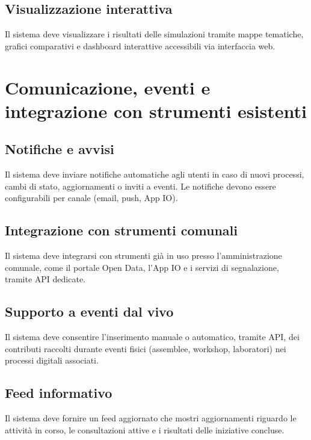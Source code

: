 \subsection{Visualizzazione interattiva}
Il sistema deve visualizzare i risultati delle simulazioni tramite mappe tematiche, grafici comparativi e dashboard interattive accessibili via interfaccia web.

\section{Comunicazione, eventi e integrazione con strumenti esistenti}

\subsection{Notifiche e avvisi}
Il sistema deve inviare notifiche automatiche agli utenti in caso di nuovi processi, cambi di stato, aggiornamenti o inviti a eventi.  
Le notifiche devono essere configurabili per canale (email, push, App IO).

\subsection{Integrazione con strumenti comunali}
Il sistema deve integrarsi con strumenti già in uso presso l’amministrazione comunale, come il portale Open Data, l’App IO e i servizi di segnalazione, tramite API dedicate.

\subsection{Supporto a eventi dal vivo}
Il sistema deve consentire l’inserimento manuale o automatico, tramite API, dei contributi raccolti durante eventi fisici (assemblee, workshop, laboratori) nei processi digitali associati.

\subsection{Feed informativo}
Il sistema deve fornire un feed aggiornato che mostri aggiornamenti riguardo le attività in corso, le consultazioni attive e i risultati delle iniziative concluse.

